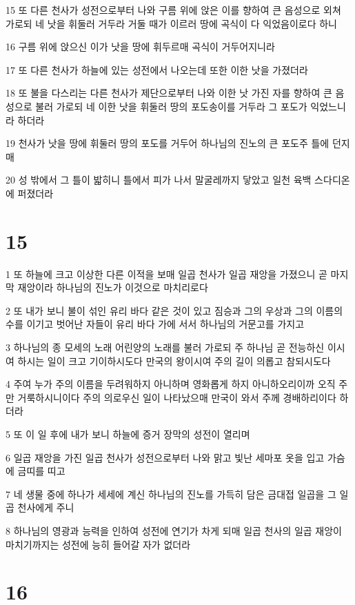 \par 15 또 다른 천사가 성전으로부터 나와 구름 위에 앉은 이를 향하여 큰 음성으로 외쳐 가로되 네 낫을 휘둘러 거두라 거둘 때가 이르러 땅에 곡식이 다 익었음이로다 하니
\par 16 구름 위에 앉으신 이가 낫을 땅에 휘두르매 곡식이 거두어지니라
\par 17 또 다른 천사가 하늘에 있는 성전에서 나오는데 또한 이한 낫을 가졌더라
\par 18 또 불을 다스리는 다른 천사가 제단으로부터 나와 이한 낫 가진 자를 향하여 큰 음성으로 불러 가로되 네 이한 낫을 휘둘러 땅의 포도송이를 거두라 그 포도가 익었느니라 하더라
\par 19 천사가 낫을 땅에 휘둘러 땅의 포도를 거두어 하나님의 진노의 큰 포도주 틀에 던지매
\par 20 성 밖에서 그 틀이 밟히니 틀에서 피가 나서 말굴레까지 닿았고 일천 육백 스다디온에 퍼졌더라

\chapter{15}

\par 1 또 하늘에 크고 이상한 다른 이적을 보매 일곱 천사가 일곱 재앙을 가졌으니 곧 마지막 재앙이라 하나님의 진노가 이것으로 마치리로다
\par 2 또 내가 보니 불이 섞인 유리 바다 같은 것이 있고 짐승과 그의 우상과 그의 이름의 수를 이기고 벗어난 자들이 유리 바다 가에 서서 하나님의 거문고를 가지고
\par 3 하나님의 종 모세의 노래 어린양의 노래를 불러 가로되 주 하나님 곧 전능하신 이시여 하시는 일이 크고 기이하시도다 만국의 왕이시여 주의 길이 의롭고 참되시도다
\par 4 주여 누가 주의 이름을 두려워하지 아니하며 영화롭게 하지 아니하오리이까 오직 주만 거룩하시니이다 주의 의로우신 일이 나타났으매 만국이 와서 주께 경배하리이다 하더라
\par 5 또 이 일 후에 내가 보니 하늘에 증거 장막의 성전이 열리며
\par 6 일곱 재앙을 가진 일곱 천사가 성전으로부터 나와 맑고 빛난 세마포 옷을 입고 가슴에 금띠를 띠고
\par 7 네 생물 중에 하나가 세세에 계신 하나님의 진노를 가득히 담은 금대접 일곱을 그 일곱 천사에게 주니
\par 8 하나님의 영광과 능력을 인하여 성전에 연기가 차게 되매 일곱 천사의 일곱 재앙이 마치기까지는 성전에 능히 들어갈 자가 없더라

\chapter{16}

